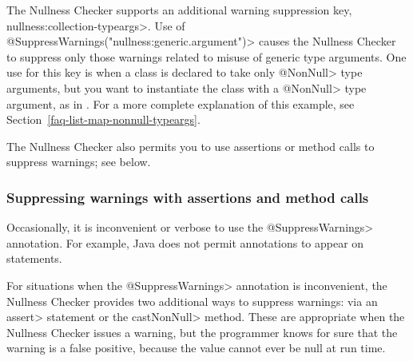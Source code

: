 The Nullness Checker supports an additional warning suppression key, 
\<nullness:collection-typeargs>.
Use of \<@SuppressWarnings("nullness:generic.argument")> causes the Nullness
Checker to suppress only those warnings related to misuse of generic type
arguments.  One use for this key is when a class is declared to take only
\<@NonNull> type arguments, but you want to instantiate the class with a
\<@NonNull> type argument, as in .  For a more
complete explanation of this example, see
Section~\ref{faq-list-map-nonnull-typeargs}.

The Nullness Checker also permits you to use assertions or method calls to
suppress warnings; see below.



\subsubsection{Suppressing warnings with assertions and method calls\label{suppressing-warnings-with-assertions}}

Occasionally, it is inconvenient or
verbose to use the \<@SuppressWarnings> annotation.  For example, Java does
not permit annotations to appear on statements.

For situations when the \<@SuppressWarnings> annotation is inconvenient,
the Nullness Checker provides two additional ways to suppress warnings:
via an \<assert> statement or the \<castNonNull> method.  These are
appropriate when the Nullness Checker issues a warning, but the programmer
knows for sure that the warning is a false positive, because the value
cannot ever be null at run time.

\newcommand{\nullnessSuppressionString}{nullness}

